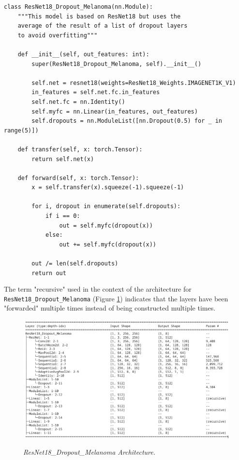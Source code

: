 \begin{Verbatim}[fontsize=\scriptsize]
class ResNet18_Dropout_Melanoma(nn.Module):
    """This model is based on ResNet18 but uses the
    average of the result of a list of dropout layers
    to avoid overfitting"""

    def __init__(self, out_features: int):
        super(ResNet18_Dropout_Melanoma, self).__init__()

        self.net = resnet18(weights=ResNet18_Weights.IMAGENET1K_V1)
        in_features = self.net.fc.in_features
        self.net.fc = nn.Identity()
        self.myfc = nn.Linear(in_features, out_features)
        self.dropouts = nn.ModuleList([nn.Dropout(0.5) for _ in range(5)])

    def transfer(self, x: torch.Tensor):
        return self.net(x)

    def forward(self, x: torch.Tensor):
        x = self.transfer(x).squeeze(-1).squeeze(-1)

        for i, dropout in enumerate(self.dropouts):
            if i == 0:
                out = self.myfc(dropout(x))
            else:
                out += self.myfc(dropout(x))

        out /= len(self.dropouts)
        return out
\end{Verbatim}

The term "recursive" used in the context of the architecture for
\texttt{ResNet18\_Dropout\_Melanoma} (Figure
\ref{fig:resnet-18-dropout-melanoma-arch}) indicates that the layers have been
"forwarded" multiple times instead of being constructed multiple times.

\begin{figure}[H]
  \centering
  \includegraphics[width=\textwidth]{imatges/methodological_contribution/ResNet18_Dropout_Melanoma.png}
  \caption[ResNet18\_Dropout\_Melanoma
  Architecture]{\textit{ResNet18\_Dropout\_Melanoma Architecture.
  }}
  {\label{fig:resnet-18-dropout-melanoma-arch}}
\end{figure}

